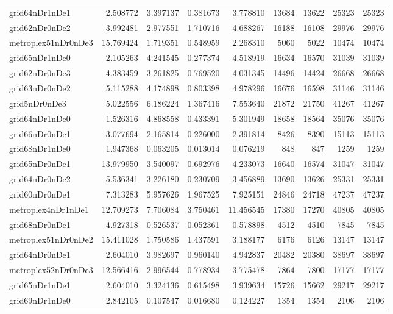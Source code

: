 \begin{longtable}{|l|r|r|r|r|r|r|r|r|}
grid64nDr1nDe1 & 2.508772 & 3.397137 & 0.381673 & 3.778810 & 13684 & 13622 & 25323 & 25323 \\
grid62nDr0nDe2 & 3.992481 & 2.977551 & 1.710716 & 4.688267 & 16188 & 16108 & 29976 & 29976 \\
metroplex51nDr0nDe3 & 15.769424 & 1.719351 & 0.548959 & 2.268310 & 5060 & 5022 & 10474 & 10474 \\
grid65nDr1nDe0 & 2.105263 & 4.241545 & 0.277374 & 4.518919 & 16634 & 16570 & 31039 & 31039 \\
grid62nDr0nDe3 & 4.383459 & 3.261825 & 0.769520 & 4.031345 & 14496 & 14424 & 26668 & 26668 \\
grid63nDr0nDe2 & 5.115288 & 4.174898 & 0.803398 & 4.978296 & 16676 & 16598 & 31146 & 31146 \\
grid5nDr0nDe3 & 5.022556 & 6.186224 & 1.367416 & 7.553640 & 21872 & 21750 & 41267 & 41267 \\
grid64nDr1nDe0 & 1.526316 & 4.868558 & 0.433391 & 5.301949 & 18658 & 18564 & 35076 & 35076 \\
grid66nDr0nDe1 & 3.077694 & 2.165814 & 0.226000 & 2.391814 & 8426 & 8390 & 15113 & 15113 \\
grid68nDr1nDe0 & 1.947368 & 0.063205 & 0.013014 & 0.076219 & 848 & 847 & 1259 & 1259 \\
grid65nDr0nDe1 & 13.979950 & 3.540097 & 0.692976 & 4.233073 & 16640 & 16574 & 31047 & 31047 \\
grid64nDr0nDe2 & 5.536341 & 3.226180 & 0.230709 & 3.456889 & 13690 & 13626 & 25331 & 25331 \\
grid60nDr0nDe1 & 7.313283 & 5.957626 & 1.967525 & 7.925151 & 24846 & 24718 & 47237 & 47237 \\
metroplex4nDr1nDe1 & 12.709273 & 7.706084 & 3.750461 & 11.456545 & 17380 & 17270 & 40805 & 40805 \\
grid68nDr0nDe1 & 4.927318 & 0.526537 & 0.052361 & 0.578898 & 4512 & 4510 & 7845 & 7845 \\
metroplex51nDr0nDe2 & 15.411028 & 1.750586 & 1.437591 & 3.188177 & 6176 & 6126 & 13147 & 13147 \\
grid64nDr0nDe1 & 2.604010 & 3.982697 & 0.960140 & 4.942837 & 20482 & 20380 & 38697 & 38697 \\
metroplex52nDr0nDe3 & 12.566416 & 2.996544 & 0.778934 & 3.775478 & 7864 & 7800 & 17177 & 17177 \\
grid65nDr1nDe1 & 2.604010 & 3.324136 & 0.615498 & 3.939634 & 15726 & 15662 & 29217 & 29217 \\
grid69nDr1nDe0 & 2.842105 & 0.107547 & 0.016680 & 0.124227 & 1354 & 1354 & 2106 & 2106 \\

\end{longtable}
